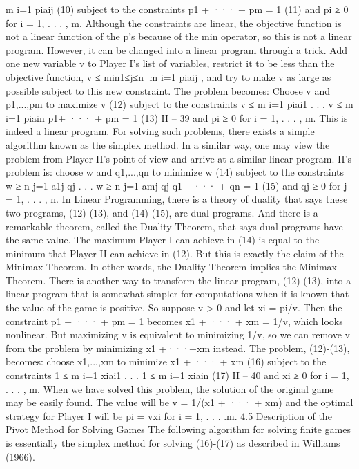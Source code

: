 m
i=1
piaij (10)
subject to the constraints
p1 + ··· + pm = 1 (11)
and
pi ≥ 0 for i = 1, . . . , m.
Although the constraints are linear, the objective function is not a linear function of
the p’s because of the min operator, so this is not a linear program. However, it can be
changed into a linear program through a trick. Add one new variable v to Player I’s list of
variables, restrict it to be less than the objective function, v ≤ min1≤j≤n
m
i=1 piaij , and
try to make v as large as possible subject to this new constraint. The problem becomes:
Choose v and p1,...,pm to
maximize v (12)
subject to the constraints
v ≤ 
m
i=1
piai1
.
.
.
v ≤ 
m
i=1
piain
p1+ ··· + pm = 1
(13)
II – 39
and
pi ≥ 0 for i = 1, . . . , m.
This is indeed a linear program. For solving such problems, there exists a simple algorithm
known as the simplex method.
In a similar way, one may view the problem from Player II’s point of view and arrive
at a similar linear program. II’s problem is: choose w and q1,...,qn to
minimize w (14)
subject to the constraints
w ≥ 
n
j=1
a1j qj
.
.
.
w ≥ 
n
j=1
amj qj
q1+ ··· + qn = 1
(15)
and
qj ≥ 0 for j = 1, . . . , n.
In Linear Programming, there is a theory of duality that says these two programs,
(12)-(13), and (14)-(15), are dual programs. And there is a remarkable theorem, called the
Duality Theorem, that says dual programs have the same value. The maximum Player I
can achieve in (14) is equal to the minimum that Player II can achieve in (12). But this is
exactly the claim of the Minimax Theorem. In other words, the Duality Theorem implies
the Minimax Theorem.
There is another way to transform the linear program, (12)-(13), into a linear program
that is somewhat simpler for computations when it is known that the value of the game
is positive. So suppose v > 0 and let xi = pi/v. Then the constraint p1 + ··· + pm = 1
becomes x1 + ··· + xm = 1/v, which looks nonlinear. But maximizing v is equivalent to
minimizing 1/v, so we can remove v from the problem by minimizing x1 +···+xm instead.
The problem, (12)-(13), becomes: choose x1,...,xm to
minimize x1 + ··· + xm (16)
subject to the constraints
1 ≤ 
m
i=1
xiai1
.
.
.
1 ≤ 
m
i=1
xiain
(17)
II – 40
and
xi ≥ 0 for i = 1, . . . , m.
When we have solved this problem, the solution of the original game may be easily found.
The value will be v = 1/(x1 + ··· + xm) and the optimal strategy for Player I will be
pi = vxi for i = 1, . . . .m.
4.5 Description of the Pivot Method for Solving Games The following algorithm
for solving finite games is essentially the simplex method for solving (16)-(17) as
described in Williams (1966).
